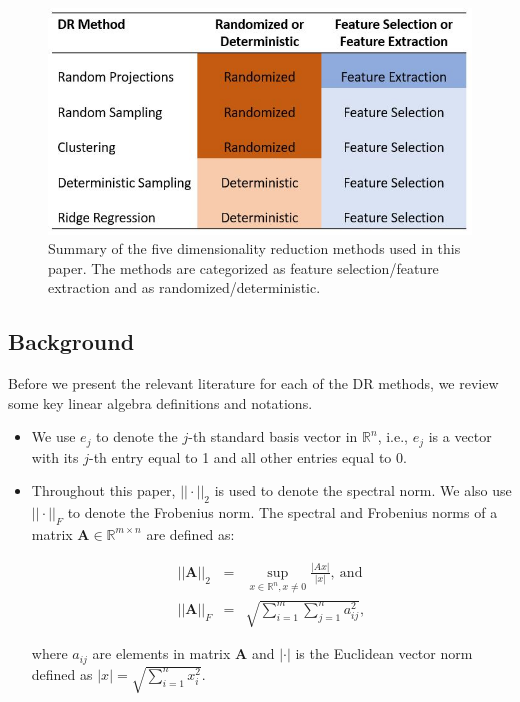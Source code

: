 \begin{center}
\begin{figure}[!t]
\centering
\includegraphics[scale=0.6]{figures/dim_red_methods_chart_2.JPG}
\caption{Summary of the five dimensionality reduction methods used in this paper. The methods are categorized as feature selection/feature extraction and as randomized/deterministic. }
\label{fig: dimRed_methods}
\end{figure}
\end{center}

\subsection{Background}
\label{sec:background}
Before we present the relevant literature for each of the DR methods, we review some key linear algebra definitions and notations. 

\begin{itemize}
\item We use $e_j$ to denote the $j$-th standard basis vector in  $\mathds{R}^n$, i.e., $e_j$ is a vector with its $j$-th entry equal to 1 and all other entries equal to 0.
\item Throughout this paper, $||\cdot||_2$ is  used to denote the spectral norm. We also use $||\cdot||_F$ to denote the Frobenius norm. The spectral and Frobenius norms of a matrix $\textbf{A} \in \mathds{R}^{m\times n}$ are defined as:

\begin{eqnarray*}
||\textbf{A}||_2 &=&  \sup_{x\in \mathds{R}^n, x\neq 0} \frac{|Ax|}{|x|},\ \text{and} \\
||\textbf{A}||_F &=& \sqrt{\sum_{i=1}^m \sum_{j=1}^n a_{ij}^2},
\end{eqnarray*}

where $a_{ij}$ are elements in matrix $\textbf{A}$ and $|\cdot|$ is the Euclidean vector norm defined as $|x| = \sqrt{\sum_{i=1}^n x_i^2}$. 

\end{itemize}

